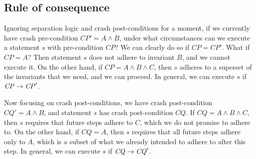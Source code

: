 %

\subsection{Rule of consequence}


Ignoring separation logic and crash post-conditions for a moment, if we
currently have crash pre-condition $\mathit{CP}'=A \wedge B$, under what circumstances
can we execute a statement $s$ with pre-condition $\mathit{CP}$? We can clearly do so if
$\mathit{CP}=\mathit{CP}'$.
What if $\mathit{CP}=A$? Then statement $s$ does not adhere to invariant $B$,
and we cannot execute it.
On the other hand, if $\mathit{CP}=A \wedge B \wedge C$, then
$s$ adheres to a superset of the invariants that we need, and we can
proceed.
In
general, we can execute $s$ if $\mathit{CP} \rightarrow \mathit{CP}'$.

Now focusing on crash post-conditions, we have crash post-condition
$\mathit{CQ}'=A \wedge B$, and statement $s$ has crash post-condition
$\mathit{CQ}$.
If $\mathit{CQ}=A \wedge B \wedge C$,
then $s$ requires that future steps adhere to $C$, which we do not promise to
adhere to.
On the other hand, if $\mathit{CQ}=A$, then $s$ requires that all future steps
adhere only to $A$, which is a subset of what we already intended to adhere to
after this step.
In general, we can execute $s$ if $\mathit{CQ} \rightarrow \mathit{CQ}'$.

